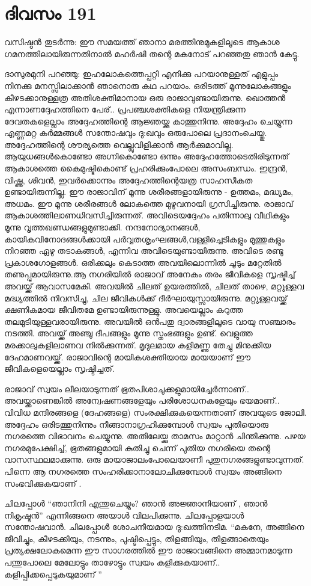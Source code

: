 \section{ദിവസം 191}


വസിഷ്ഠൻ തുടർന്നു: ഈ സമയത്ത് ഞാനാ മരത്തിനുമുകളിലൂടെ ആകാശ ഗമനത്തിലായിരുന്നതിനാൽ മഹർഷി തന്റെ മകനോട് പറഞ്ഞതു ഞാൻ കേട്ടു.

ദാസുരമുനി പറഞ്ഞു: ഇഹലോകത്തെപ്പറ്റി എനിക്കു പറയാനുള്ളത് എളുപ്പം നിനക്കു മനസ്സിലാക്കാൻ ഞാനൊരു കഥ പറയാം. ഒരിടത്ത് മൂന്നുലോകങ്ങളും കീഴടക്കാനുള്ളത്ര അതിശക്തിമാനായ ഒരു രാജാവുണ്ടായിരുന്നു. ഖൊത്തൻ എന്നാണദ്ദേഹത്തിനെ പേര്‌.. പ്രപഞ്ചശക്തികളെ നിയന്ത്രിക്കുന്ന ദേവതകളെല്ലാം അദ്ദേഹത്തിന്റെ ആജ്ഞയ്ക്കു കാത്തുനിന്നു. അദ്ദേഹം ചെയ്യുന്ന എണ്ണമറ്റ കര്‍മ്മങ്ങള്‍ സന്തോഷവും ദു:ഖവും ഒരുപോലെ പ്രദാനംചെയ്തു. അദ്ദേഹത്തിന്റെ ശൗര്യത്തെ വെല്ലുവിളിക്കാൻ ആർക്കുമാവില്ല. ആയുധങ്ങൾകൊണ്ടോ അഗ്നികൊണ്ടോ ഒന്നും അദ്ദേഹത്തോടെതിരിടുന്നത് ആകാശത്തെ കൈമുഷ്ടികൊണ്ട് പ്രഹരിക്കുംപോലെ  അസംബന്ധം. ഇന്ദ്രൻ, വിഷ്ണു, ശിവൻ, ഇവർക്കൊന്നും അദ്ദേഹത്തിന്റെയത്ര സാഹസീകത ഉണ്ടായിരുന്നില്ല. ഈ രാജാവിന്‌ മൂന്നു ശരീരങ്ങളായിരുന്നു - ഉത്തമം, മദ്ധ്യമം, അധമം. ഈ മൂന്നു ശരീരങ്ങൾ ലോകത്തെ മുഴുവനായി ഗ്രസിച്ചിരുന്നു. രാജാവ് ആകാശത്തിലാണധിവസിച്ചിരുന്നത്. അവിടെയദ്ദേഹം പതിന്നാലു വീഥികളും മൂന്നു വൃത്തഖണ്ഡങ്ങളുമുണ്ടാക്കി. നന്ദനോദ്യാനങ്ങൾ, കായികവിനോദങ്ങൾക്കായി പർവ്വതശൃംഘങ്ങൾ,വള്ളിച്ചെടികളും മുത്തുകളും നിറഞ്ഞ ഏഴു തടാകങ്ങൾ, എന്നിവ അവിടെയുണ്ടായിരുന്നു. അവിടെ രണ്ടു പ്രകാശഗോളങ്ങൾ. ഒരിക്കലും കെടാത്ത അവയിലൊന്നിൽ ചൂടും മറ്റേതിൽ തണുപ്പുമായിരുന്നു.ആ നഗരിയിൽ രാജാവ് അനേകം തരം ജീവികളെ സൃഷ്ടിച്ച് അവയ്ക്ക് ആവാസമേകി. അവയിൽ ചിലത് ഉയരത്തിൽ, ചിലത് താഴെ, മറ്റുള്ളവ മദ്ധ്യത്തിൽ നിവസിച്ചു, ചില ജീവികൾക്ക് ദീർഘായുസ്സായിരുന്നു. മറ്റുള്ളവയ്ക്ക് ക്ഷണികമായ ജീവിതമേ ഉണ്ടായിരുന്നുള്ളു. അവയെല്ലാം കറുത്ത തലമുടിയുള്ളവരായിരുന്നു. അവയില്‍  ഒൻപതു ദ്വാരങ്ങളിലൂടെ വായു സഞ്ചാരം നടത്തി. അവയ്ക്ക് അഞ്ചു ദീപങ്ങളും മൂന്നു സ്തംഭങ്ങളും ഉണ്ട്. വെളുത്ത മരക്കാലുകളിലാണവ നില്‍ക്കുന്നത്. മൃദുലമായ കളിമണ്ണു തേച്ചു മിനുക്കിയ ദേഹമാണവയ്ക്ക്. രാജാവിന്റെ മായികശക്തിയായ മായയാണ്‌ ഈ ജീവികളെയെല്ലാം സൃഷ്ടിച്ചത്.

രാജാവ് സ്വയം ലീലയാടുന്നത് ഭൂതപിശാചുക്കളുമായിച്ചേർന്നാണ്‌.. അവയ്ക്കാണെങ്കിൽ അന്വേഷണങ്ങളേയും പരിശോധനകളേയും ഭയമാണ്‌.. വിവിധ മന്ദിരങ്ങളെ (ദേഹങ്ങളെ) സംരക്ഷിക്കുകയെന്നതാണ്‌ അവയുടെ ജോലി. അദ്ദേഹം ഒരിടത്തുനിന്നും നീങ്ങാനാഗ്രഹിക്കുമ്പോൾ സ്വയം പുതിയൊരു നഗരത്തെ വിഭാവനം ചെയ്യുന്നു. അതിലേയ്ക്കു താമസം മാറ്റാൻ ചിന്തിക്കുന്നു. പഴയ നഗരമുപേക്ഷിച്ച്, ഭൂതങ്ങളുമായി കുതിച്ചു ചെന്ന് പുതിയ നഗരിയെ തന്റെ വാസസ്ഥലമാക്കുന്നു. ഒരു മായാജാലംപോലെയാണീ പുതുനഗരങ്ങളുണ്ടാവുന്നത്. പിന്നെ  ആ നഗരത്തെ സംഹരിക്കാനാലോചിക്കുമ്പോൾ സ്വയം അങ്ങിനെ സംഭവിക്കുകയാണ് .

ചിലപ്പോൾ “ഞാനിനി എന്തുചെയ്യും? ഞാൻ അജ്ഞാനിയാണ് , ഞാൻ നികൃഷ്ടൻ” എന്നിങ്ങനെ അയാള്‍ വിലപിക്കുന്നു. ചിലപ്പോളയാള്‍ സന്തോഷവാൻ. ചിലപ്പോൾ ശോചനീയമായ ദു:ഖത്തിനടിമ. “മകനേ, അങ്ങിനെ ജീവിച്ചും, കീഴടക്കിയും, നടന്നും, പുഷ്ടിപ്പെട്ടും, തിളങ്ങിയും, തിളങ്ങാതെയും പ്രത്യക്ഷലോകമെന്ന ഈ സാഗരത്തിൽ ഈ രാജാവങ്ങിനെ അമ്മാനമാടുന്ന പന്തുപോലെ മേലോട്ടും താഴോട്ടും സ്വയം കളിക്കുകയാണ്‌.. കളിപ്പിക്കപ്പെടുകയുമാണ്‌ ” 
